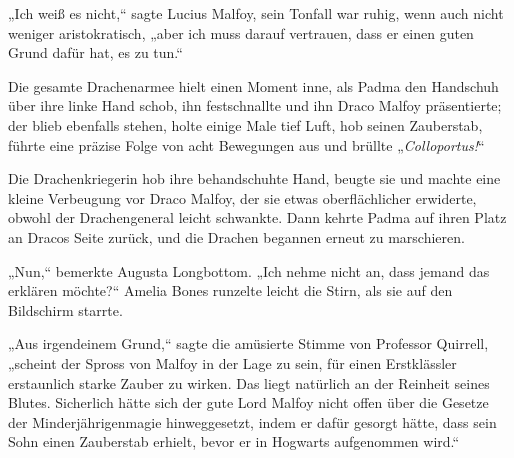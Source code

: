 „Ich weiß es nicht,“ sagte Lucius Malfoy, sein Tonfall war ruhig, wenn auch nicht weniger aristokratisch, „aber ich muss darauf vertrauen, dass er einen guten Grund dafür hat, es zu tun.“

Die gesamte Drachenarmee hielt einen Moment inne, als Padma den Handschuh über ihre linke Hand schob, ihn festschnallte und ihn Draco Malfoy präsentierte; der blieb ebenfalls stehen, holte einige Male tief Luft, hob seinen Zauberstab, führte eine präzise Folge von acht Bewegungen aus und brüllte „\emph{Colloportus!}“

Die Drachenkriegerin hob ihre behandschuhte Hand, beugte sie und machte eine kleine Verbeugung vor Draco Malfoy, der sie etwas oberflächlicher erwiderte, obwohl der Drachengeneral leicht schwankte. Dann kehrte Padma auf ihren Platz an Dracos Seite zurück, und die Drachen begannen erneut zu marschieren.

„Nun,“ bemerkte Augusta Longbottom. „Ich nehme nicht an, dass jemand das erklären möchte?“ Amelia Bones runzelte leicht die Stirn, als sie auf den Bildschirm starrte.

„Aus irgendeinem Grund,“ sagte die amüsierte Stimme von Professor Quirrell, „scheint der Spross von Malfoy in der Lage zu sein, für einen Erstklässler erstaunlich starke Zauber zu wirken. Das liegt natürlich an der Reinheit seines Blutes. Sicherlich hätte sich der gute Lord Malfoy nicht offen über die Gesetze der Minderjährigenmagie hinweggesetzt, indem er dafür gesorgt hätte, dass sein Sohn einen Zauberstab erhielt, bevor er in Hogwarts aufgenommen wird.“


